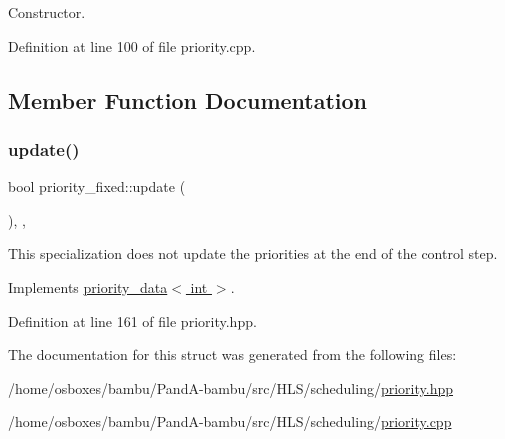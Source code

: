 Constructor. 



Definition at line 100 of file priority.\+cpp.



\subsection{Member Function Documentation}
\mbox{\label{structpriority__fixed_ad7f69dcb5974fda7d05af656dbaee1c7}} 
\subsubsection{\texorpdfstring{update()}{update()}}
{\footnotesize\ttfamily bool priority\+\_\+fixed\+::update (\begin{DoxyParamCaption}{ }\end{DoxyParamCaption})\hspace{0.3cm}{\ttfamily [inline]}, {\ttfamily [override]}, {\ttfamily [virtual]}}



This specialization does not update the priorities at the end of the control step. 



Implements \hyperlink{structpriority__data_a3cd70f3b6d8e300615ad91fd85291c76}{priority\+\_\+data$<$ int $>$}.



Definition at line 161 of file priority.\+hpp.



The documentation for this struct was generated from the following files\+:\begin{DoxyCompactItemize}
\item 
/home/osboxes/bambu/\+Pand\+A-\/bambu/src/\+H\+L\+S/scheduling/\hyperlink{priority_8hpp}{priority.\+hpp}\item 
/home/osboxes/bambu/\+Pand\+A-\/bambu/src/\+H\+L\+S/scheduling/\hyperlink{priority_8cpp}{priority.\+cpp}\end{DoxyCompactItemize}
